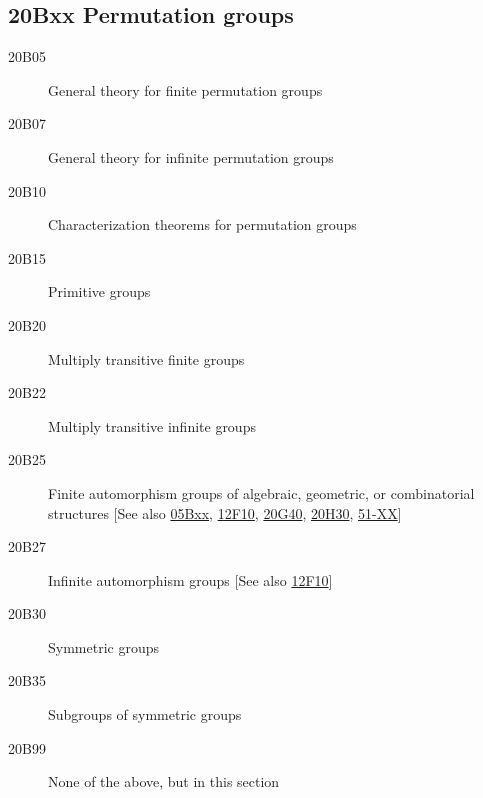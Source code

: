 \documentclass[letterpaper]{article}
\begin{document}
\subsection*{20Bxx  Permutation groups }\label{20Bxx}
\begin{description}  
\item [20B05]\label{20B05} General theory for finite permutation groups
\item [20B07]\label{20B07} General theory for infinite permutation groups
\item [20B10]\label{20B10} Characterization theorems for permutation groups
\item [20B15]\label{20B15} Primitive groups
\item [20B20]\label{20B20} Multiply transitive finite groups
\item [20B22]\label{20B22} Multiply transitive infinite groups
\item [20B25]\label{20B25} Finite automorphism groups of algebraic, geometric, or combinatorial structures [See also \hyperref[05Bxx]{05Bxx}, \hyperref[12F10]{12F10}, \hyperref[20G40]{20G40}, \hyperref[20H30]{20H30}, \hyperref[51-XX]{51-XX}]
\item [20B27]\label{20B27} Infinite automorphism groups [See also \hyperref[12F10]{12F10}]
\item [20B30]\label{20B30} Symmetric groups
\item [20B35]\label{20B35} Subgroups of symmetric groups
\item [20B99]\label{20B99} None of the above, but in this section
\end{description}
\end{document}
